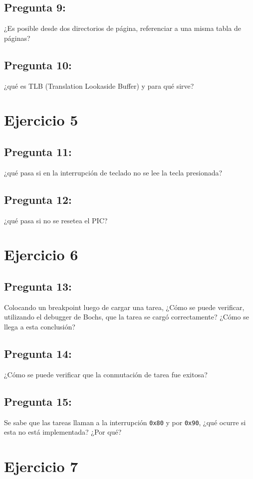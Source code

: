 \documentclass[10pt, a4paper]{article}
\begin{document}
{\subsection{Pregunta 9:}} ¿Es posible desde dos directorios de página, referenciar a una misma tabla de páginas? 
{\subsection{Pregunta 10:}} ¿qué es TLB (Translation Lookaside Buffer) y para qué sirve?

\section{Ejercicio 5}
{\subsection{Pregunta 11:}} ¿qué pasa si en la interrupción de teclado no se lee la tecla presionada?
{\subsection{Pregunta 12:}} ¿qué pasa si no se resetea el PIC?
\section{Ejercicio 6}

{\subsection{Pregunta 13:}} Colocando un breakpoint luego de cargar una tarea, ¿Cómo se puede verificar, utilizando el debugger de Bochs, que la tarea se cargó correctamente?
¿Cómo se llega a esta conclusión?

{\subsection{Pregunta 14:}} ¿Cómo se puede verificar que la conmutación de tarea fue exitosa?
{\subsection{Pregunta 15:}} Se sabe que las tareas llaman a la interrupción \texttt{0x80} y por \texttt{0x90}, ¿qué ocurre si esta no está implementada? ¿Por qué?
\section{Ejercicio 7}
\end{document}
